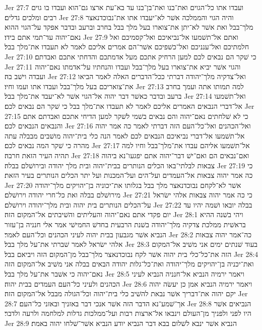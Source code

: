 Jer 27:7  ועבדו אתו כל־הגוים ואת־בנו ואת־בן־בנו עד בא־עת ארצו גם־הוא ועבדו בו גוים רבים ומלכים גדלים׃
Jer 27:8  והיה הגוי והממלכה אשׁר לא־יעבדו אתו את־נבוכדנאצר מלך־בבל ואת אשׁר לא־יתן את־צוארו בעל מלך בבל בחרב וברעב ובדבר אפקד על־הגוי ההוא נאם־יהוה עד־תמי אתם בידו׃
Jer 27:9  ואתם אל־תשׁמעו אל־נביאיכם ואל־קסמיכם ואל חלמתיכם ואל־ענניכם ואל־כשׁפיכם אשׁר־הם אמרים אליכם לאמר לא תעבדו את־מלך בבל׃
Jer 27:10  כי שׁקר הם נבאים לכם למען הרחיק אתכם מעל אדמתכם והדחתי אתכם ואבדתם׃
Jer 27:11  והגוי אשׁר יביא את־צוארו בעל מלך־בבל ועבדו והנחתיו על־אדמתו נאם־יהוה ועבדה וישׁב בה׃
Jer 27:12  ואל־צדקיה מלך־יהודה דברתי ככל־הדברים האלה לאמר הביאו את־צואריכם בעל מלך־בבל ועבדו אתו ועמו וחיו׃
Jer 27:13  למה תמותו אתה ועמך בחרב ברעב ובדבר כאשׁר דבר יהוה אל־הגוי אשׁר לא־יעבד את־מלך בבל׃
Jer 27:14  ואל־תשׁמעו אל־דברי הנבאים האמרים אליכם לאמר לא תעבדו את־מלך בבל כי שׁקר הם נבאים לכם׃
Jer 27:15  כי לא שׁלחתים נאם־יהוה והם נבאים בשׁמי לשׁקר למען הדיחי אתכם ואבדתם אתם והנבאים הנבאים לכם׃
Jer 27:16  ואל־הכהנים ואל־כל־העם הזה דברתי לאמר כה אמר יהוה אל־תשׁמעו אל־דברי נביאיכם הנבאים לכם לאמר הנה כלי בית־יהוה מושׁבים מבבלה עתה מהרה כי שׁקר המה נבאים לכם׃
Jer 27:17  אל־תשׁמעו אליהם עבדו את־מלך־בבל וחיו למה תהיה העיר הזאת חרבה׃
Jer 27:18  ואם־נבאים הם ואם־ישׁ דבר־יהוה אתם יפגעו־נא ביהוה צבאות לבלתי־באו הכלים הנותרים בבית־יהוה ובית מלך יהודה ובירושׁלם בבלה׃
Jer 27:19  כי כה אמר יהוה צבאות אל־העמדים ועל־הים ועל־המכנות ועל יתר הכלים הנותרים בעיר הזאת׃
Jer 27:20  אשׁר לא־לקחם נבוכדנאצר מלך בבל בגלותו את־יכוניה בן־יהויקים מלך־יהודה מירושׁלם בבלה ואת כל־חרי יהודה וירושׁלם׃
Jer 27:21  כי כה אמר יהוה צבאות אלהי ישׂראל על־הכלים הנותרים בית יהוה ובית מלך־יהודה וירושׁלם׃
Jer 27:22  בבלה יובאו ושׁמה יהיו עד יום פקדי אתם נאם־יהוה והעליתים והשׁיבתים אל־המקום הזה׃
Jer 28:1  ויהי בשׁנה ההיא בראשׁית ממלכת צדקיה מלך־יהודה בשׁנת הרבעית בחדשׁ החמישׁי אמר אלי חנניה בן־עזור הנביא אשׁר מגבעון בבית יהוה לעיני הכהנים וכל־העם לאמר׃
Jer 28:2  כה־אמר יהוה צבאות אלהי ישׂראל לאמר שׁברתי את־על מלך בבל׃
Jer 28:3  בעוד שׁנתים ימים אני משׁיב אל־המקום הזה את־כל־כלי בית יהוה אשׁר לקח נבוכדנאצר מלך־בבל מן־המקום הזה ויביאם בבל׃
Jer 28:4  ואת־יכניה בן־יהויקים מלך־יהודה ואת־כל־גלות יהודה הבאים בבלה אני משׁיב אל־המקום הזה נאם־יהוה כי אשׁבר את־על מלך בבל׃
Jer 28:5  ויאמר ירמיה הנביא אל־חנניה הנביא לעיני הכהנים ולעיני כל־העם העמדים בבית יהוה׃
Jer 28:6  ויאמר ירמיה הנביא אמן כן יעשׂה יהוה יקם יהוה את־דבריך אשׁר נבאת להשׁיב כלי בית־יהוה וכל־הגולה מבבל אל־המקום הזה׃
Jer 28:7  אך־שׁמע־נא הדבר הזה אשׁר אנכי דבר באזניך ובאזני כל־העם׃
Jer 28:8  הנביאים אשׁר היו לפני ולפניך מן־העולם וינבאו אל־ארצות רבות ועל־ממלכות גדלות למלחמה ולרעה ולדבר׃
Jer 28:9  הנביא אשׁר ינבא לשׁלום בבא דבר הנביא יודע הנביא אשׁר־שׁלחו יהוה באמת׃
